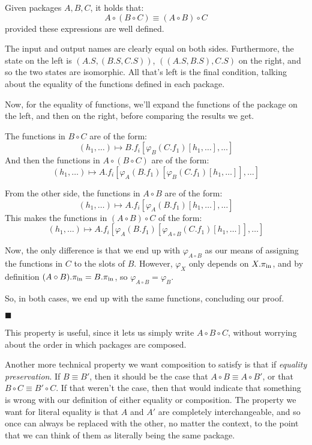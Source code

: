 \begin{lemma}
    Given packages $A, B, C$, it holds that:
    $$
    A \circ (B \circ C) \equiv (A \circ B) \circ C
    $$
    provided these expressions are well defined.

     The input and output names are clearly equal on both sides.
    Furthermore, the state on the left is $(A.S, (B.S, C.S))$,
    $((A.S, B.S), C.S)$ on the right, and so the two states are isomorphic.
    All that's left is the final condition, talking about the equality
    of the functions defined in each package.

    Now, for the equality of functions, we'll expand the functions
    of the package on the left, and then on the right, before comparing
    the results we get.

    The functions in $B \circ C$ are of the form:
    $$
    (h_1, \ldots) \mapsto B.f_i[\varphi_{B}(C.f_1)[h_1, \ldots], \ldots]
    $$
    And then the functions in $A \circ (B \circ C)$ are of the form:
    $$
    (h_1, \ldots) \mapsto A.f_i[\varphi_{A}(B.f_1)[\varphi_{B}(C.f_1)[h_1, \ldots]], \ldots]
    $$

    From the other side, the functions in $A \circ B$ are of the form:
    $$
    (h_1, \ldots) \mapsto A.f_i[\varphi_{A}(B.f_1)[h_1, \ldots], \ldots]
    $$
    This makes the functions in $(A \circ B) \circ C$ of the form:
    $$
    (h_1, \ldots) \mapsto A.f_i[\varphi_{A}(B.f_1)[\varphi_{A \circ B}(C.f_1)[h_1, \ldots]], \ldots]
    $$

    Now, the only difference is that we end up with $\varphi_{A \circ B}$
    as our means of assigning the functions in $C$ to the slots
    of $B$.
    However, $\varphi_{X}$ only depends on $X.\pi_{\text{in}}$,
    and by definition $(A \circ B).\pi_{\text{in}} = B.\pi_{\text{in}}$,
    so $\varphi_{A \circ B} = \varphi_B$.

    So, in both cases, we end up with the same functions, concluding
    our proof.

    $\blacksquare$
\end{lemma}

This property is useful, since it lets us simply write $A \circ B \circ C$,
without worrying about the order in which packages are composed.

Another more technical property we want composition to satisfy is
that if \emph{equality preservation}.
If $B \equiv B'$, then it should be the case that $A \circ B \equiv A \circ B'$,
or that $B \circ C \equiv B' \circ C$.
If that weren't the case, then that would indicate that something is wrong
with our definition of either equality or composition.
The property we want for literal equality is that $A$ and $A'$ are completely
interchangeable, and so once can always be replaced with the other, no matter
the context, to the point that we can think of them as literally being the same
package.

